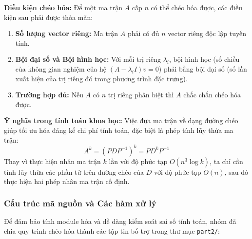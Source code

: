 \documentclass[12pt,a4paper]{article}
\begin{document}
\textbf{Điều kiện chéo hóa:}
Để một ma trận $A$ cấp $n$ có thể chéo hóa được, các điều kiện sau phải được thỏa mãn:
\begin{enumerate}[label=\textbf{\alph*)}]
    \item \textbf{Số lượng vector riêng:} Ma trận $A$ phải có đủ $n$ vector riêng độc lập tuyến tính. 
    \item \textbf{Bội đại số và Bội hình học:} Với mỗi trị riêng $\lambda_i$, bội hình học (số chiều của không gian nghiệm của hệ $(A - \lambda_i I)v = 0$) phải bằng bội đại số (số lần xuất hiện của trị riêng đó trong phương trình đặc trưng).
    \item \textbf{Trường hợp đủ:} Nếu $A$ có $n$ trị riêng phân biệt thì $A$ chắc chắn chéo hóa được.
\end{enumerate}

\textbf{Ý nghĩa trong tính toán khoa học:}
Việc đưa ma trận về dạng đường chéo giúp tối ưu hóa đáng kể chi phí tính toán, đặc biệt là phép tính lũy thừa ma trận:
\begin{equation}
    A^k = (PDP^{-1})^k = PD^kP^{-1}
\end{equation}
Thay vì thực hiện nhân ma trận $k$ lần với độ phức tạp $O(n^3 \log k)$, ta chỉ cần tính lũy thừa các phần tử trên đường chéo của $D$ với độ phức tạp $O(n)$, sau đó thực hiện hai phép nhân ma trận cố định.

\subsubsection{Cấu trúc mã nguồn và Các hàm xử lý}
Để đảm bảo tính module hóa và dễ dàng kiểm soát sai số tính toán, nhóm đã chia quy trình chéo hóa thành các tập tin bổ trợ trong thư mục \texttt{part2/}:
\end{document}
